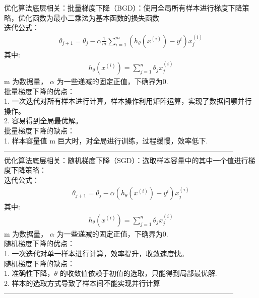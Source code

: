 \documentclass{article}
\begin{document}
\noindent 优化算法底层相关：批量梯度下降（BGD）：使用全局所有样本进行梯度下降策略，优化函数为最小二乘法为基本函数的损失函数\\
迭代公式：
\begin{eqnarray*}
\theta_{j+1} = \theta_{j} - \alpha\frac{1}{m}\sum_{i=1}^{m}(h_{\theta}(x^{(i)})- y^{i})x^{(i)}_{j}
\end{eqnarray*}
其中:
\begin{eqnarray*}
h_{\theta}(x^{(i)}) = \sum_{j=1}^{n}\theta_{j}x_{j}^{(i)}
\end{eqnarray*}
m 为数据量， $\alpha$ 为一些递减的固定正值，下确界为0.\\
批量梯度下降的优点：\\
1. 一次迭代对所有样本进行计算，样本操作利用矩阵运算，实现了数据间颚并行操作。\\
2. 容易得到全局最优解。\\
批量梯度下降的缺点：\\
1. 样本容量值 m 巨大时，对全局进行训练，过程缓慢，效率低下.\\
--------------------------------------------------------------------------------------------------\\

\noindent 优化算法底层相关：随机梯度下降（SGD）：选取样本容量中的其中一个值进行梯度下降策略：\\
迭代公式：
\begin{eqnarray*}
\theta_{j+1} = \theta_{j} - \alpha(h_{\theta}(x^{(i)})- y^{i})x^{(i)}_{j}
\end{eqnarray*}
其中:
\begin{eqnarray*}
h_{\theta}(x^{(i)}) = \sum_{j=1}^{n}\theta_{j}x_{j}^{(i)}
\end{eqnarray*}
m 为数据量， $\alpha$ 为一些递减的固定正值，下确界为0.\\
随机梯度下降的优点：\\
1. 一次迭代对单一样本进行计算，效率提升，收敛速度快。\\
随机梯度下降的缺点：\\
1. 准确性下降，$\theta$ 的收敛值依赖于初值的选取，只能得到局部最优解.\\
2. 样本的选取方式导致了样本间不能实现并行计算\\
--------------------------------------------------------------------------------------------------\\
\end{document}

